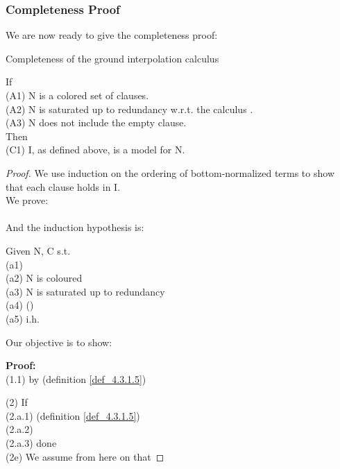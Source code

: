 \noindent
\subsubsection*{Completeness Proof}
We are now ready to give the completeness proof:

\begin{theorem}{Completeness of the ground interpolation calculus}


\noindent
If\\
(A1) N is a colored set of clauses.\\
(A2) N is saturated up to redundancy w.r.t. the calculus .\\
(A3) N does not include the empty clause.\\
Then\\
(C1) I, as defined above, is a model for N.
	

\begin{proof}
	We use induction on the ordering of bottom-normalized terms to show that each clause holds in I.\\ 
	We prove:\\
	\\
	And the induction hypothesis is:\\
	
\bigskip
	
	\noindent
	Given N, C s.t.\\
	(a1) \\
	(a2) N is coloured\\
	(a3) N is saturated up to redundancy\\
	(a4)  ()\\
	(a5) i.h. 
	
	\noindent
	Our objective is to show:\\
	
	\bigskip
	
	\noindent
	\textbf{Proof:}\\
	(1.1)  by (definition \ref{def_4.3.1.5})

	\bigskip

	\noindent
	(2) If \\
	\indent (2.a.1)  (definition \ref{def_4.3.1.5})\\
	\indent (2.a.2) \\
	\indent (2.a.3) done\\
	(2e) We assume from here on that 
	

\end{proof}
\end{theorem}

